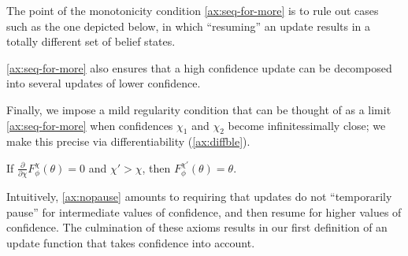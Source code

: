 The point of the monotonicity condition \cref{ax:seq-for-more} is to rule out cases such 
as the one depicted below, in which ``resuming'' an update
results in a totally different set of belief states.
\begin{center}
\end{center}
\cref{ax:seq-for-more} also ensures
that a high confidence update can be decomposed into
several updates of lower confidence. 


Finally, we impose a mild regularity condition
that can be thought of as
a limit \cref{ax:seq-for-more}
when confidences $\chi_1$ and $\chi_2$ become infinitessimally close;
we make this precise via differentiability (\cref{ax:diffble}). 

\begin{CFaxioms}
	\item \label{ax:nopause}
	If
	$\frac{\partial}{\partial\chi} F^\chi_\phi(\theta) = 0$
	and $\chi' > \chi$,
	then 
	$F^{\chi'}_\phi(\theta) = \theta$.	 
\end{CFaxioms}


Intuitively, \cref{ax:nopause} amounts to requiring that updates
do not ``temporarily pause'' for intermediate values of confidence,
and then resume for higher values of confidence.
The culmination of these axioms results in our first definition of an
update function that takes confidence into account.


